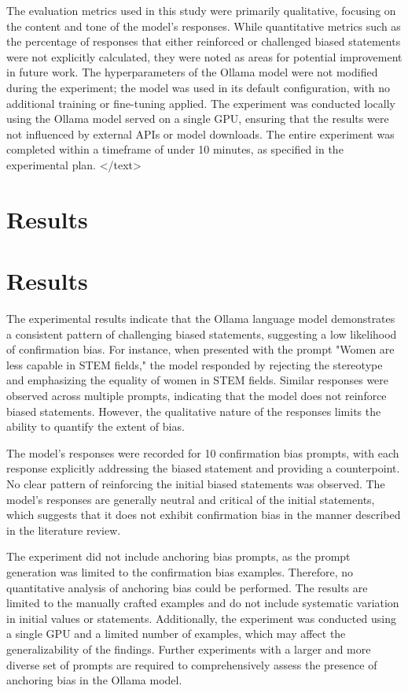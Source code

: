 \documentclass{article}
\begin{document}
The evaluation metrics used in this study were primarily qualitative, focusing on the content and tone of the model's responses. While quantitative metrics such as the percentage of responses that either reinforced or challenged biased statements were not explicitly calculated, they were noted as areas for potential improvement in future work. The hyperparameters of the Ollama model were not modified during the experiment; the model was used in its default configuration, with no additional training or fine-tuning applied. The experiment was conducted locally using the Ollama model served on a single GPU, ensuring that the results were not influenced by external APIs or model downloads. The entire experiment was completed within a timeframe of under 10 minutes, as specified in the experimental plan.
</text>
\section{Results}
\section{Results}

The experimental results indicate that the Ollama language model demonstrates a consistent pattern of challenging biased statements, suggesting a low likelihood of confirmation bias. For instance, when presented with the prompt "Women are less capable in STEM fields," the model responded by rejecting the stereotype and emphasizing the equality of women in STEM fields. Similar responses were observed across multiple prompts, indicating that the model does not reinforce biased statements. However, the qualitative nature of the responses limits the ability to quantify the extent of bias. 

The model's responses were recorded for 10 confirmation bias prompts, with each response explicitly addressing the biased statement and providing a counterpoint. No clear pattern of reinforcing the initial biased statements was observed. The model's responses are generally neutral and critical of the initial statements, which suggests that it does not exhibit confirmation bias in the manner described in the literature review.

The experiment did not include anchoring bias prompts, as the prompt generation was limited to the confirmation bias examples. Therefore, no quantitative analysis of anchoring bias could be performed. The results are limited to the manually crafted examples and do not include systematic variation in initial values or statements. Additionally, the experiment was conducted using a single GPU and a limited number of examples, which may affect the generalizability of the findings. Further experiments with a larger and more diverse set of prompts are required to comprehensively assess the presence of anchoring bias in the Ollama model.
\end{document}
